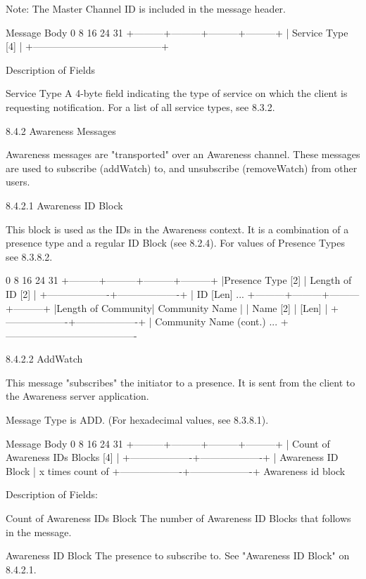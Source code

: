 \documentclass[titlepage,oneside]{book}
\begin{document}
Note: The Master Channel ID is included in the message header.

Message Body
0         8         16        24      31
+---------+---------+---------+---------+
|            Service Type  [4]          |
+---------------------------------------+

Description of Fields

Service Type
  A 4-byte field indicating the type of service on which the client is 
  requesting notification. For a list of all service types, see 
  8.3.2.

8.4.2 Awareness Messages

Awareness messages are "transported" over an Awareness channel. These
messages are used to subscribe (addWatch) to, and unsubscribe
(removeWatch) from other users.

8.4.2.1 Awareness ID Block

This block is used as the IDs in the Awareness context. It is a 
combination of a presence type and a regular ID Block (see 
8.2.4). For values of Presence Types see 
8.3.8.2.

0         8         16        24      31
+---------+---------+---------+---------+
|Presence Type [2]  | Length of ID [2]  |
+-------------------+-------------------+
|              ID [Len] ...
+---------+---------+---------+---------+
|Length of Community| Community Name    |
|   Name [2]        |      [Len]        |
+-------------------+-------------------+
|   Community Name (cont.) ...
+----------------------------------------

8.4.2.2 AddWatch

This message "subscribes" the initiator to a presence. It is sent
from the client to the Awareness server application.

Message Type is ADD.
  (For hexadecimal values, see 8.3.8.1).

Message Body
0         8         16        24      31
+---------+---------+---------+---------+
| Count of Awareness IDs Blocks [4]     |
+-------------------+-------------------+
| Awareness ID Block                    | x times count of
+-------------------+-------------------+   Awareness id block

Description of Fields:

Count of Awareness IDs Block
  The number of Awareness ID Blocks that follows in the message.

Awareness ID Block
  The presence to subscribe to. See "Awareness ID Block" on
8.4.2.1.
\end{document}
